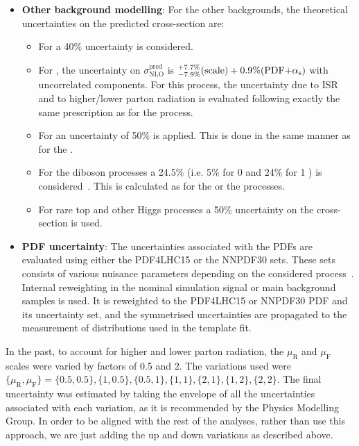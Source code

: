\begin{itemize}
	\item \textbf{Other background modelling}:	   For the other backgrounds, the theoretical uncertainties on 
		the predicted cross-section are:
		\begin{itemize}
			\item For \Wjets a 40\% uncertainty is considered.
			\item For \tZq, the uncertainty on $\sigma^{\text{pred}}_{\text{NLO}}$ is 
			 $^{+7.7\%}_{-7.9\%}(\text{scale})+0.9\%(\text{PDF+\ensuremath{\alpha_{\text{s}}}})$ with uncorrelated components. 
			For this process, the uncertainty due to ISR and to higher/lower parton radiation is evaluated 
			following exactly the same prescription as for the \tchannel process.
			\item For \tWZ an uncertainty of 50\% is applied. This is done in the same manner as for the \Zjets.
			\item For the diboson processes a 24.5\% (i.e. 5\% for 0 \bjets and 24\% for 1 \bjets) 
			is considered~\cite{Berends:1991}. This is calculated as for the \Zjets or the \tWZ processes.
			\item For rare top and other Higgs processes a 50\% uncertainty on the cross-section is used. 
		\end{itemize}


	\item \textbf{PDF uncertainty}:  The uncertainties associated with the PDFs are evaluated using 
		either the PDF4LHC15 or the NNPDF30 sets. These sets consists of various nuisance parameters 
		depending on the considered process~\cite{Butterworth:2015oua}.
		Internal reweighting in the nominal simulation signal or main background samples is used. 
		It is reweighted to the PDF4LHC15 or NNPDF30 PDF and its uncertainty set, and the symmetrised 
		uncertainties are propagated to the measurement of distributions used in the template fit.


\end{itemize}

In the past, to account for higher and lower parton radiation, the $\mu_{\text{R}}$ and $\mu_{\text{F}}$ scales were varied 
by factors of 0.5 and 2. The variations used were $\{\mu_{\text{R}}, \mu_{\text{F}}\} = \{0.5,0.5\}, \{1,0.5\}, \{0.5,1\}, \{1,1\}, \{2,1\}, \{1,2\}, \{2,2\}$. 
The final uncertainty was estimated by taking the envelope of all the uncertainties associated with 
each variation, as it is recommended by the Physics Modelling 
Group. %
In order to be aligned with the rest of the analyses, rather than use this approach, we are just adding the up and down variations as
described above.

